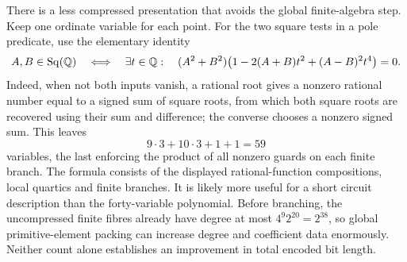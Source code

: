 There is a less compressed presentation that avoids the global finite-algebra
step. Keep one ordinate variable for each point. For the two square tests
in a pole predicate, use the elementary identity
\[
 A,B\in\operatorname{Sq}(\mathbb Q)\quad\Longleftrightarrow\quad
 \exists t\in\mathbb Q:\quad
 (A^2+B^2)\bigl(1-2(A+B)t^2+(A-B)^2t^4\bigr)=0.
\]
Indeed, when not both inputs vanish, a rational root gives a nonzero
rational number equal to a signed sum of square roots, from which both
square roots are recovered using their sum and difference; the converse
chooses a nonzero signed sum. This leaves
\[
              9\cdot3+10\cdot3+1+1=59
\]
variables, the last enforcing the product of all nonzero guards on each
finite branch. The formula consists of the displayed rational-function
compositions, local quartics and finite branches. It is likely more useful
for a short circuit description than the forty-variable polynomial.
Before branching, the uncompressed finite fibres already have degree at
most $4^9 2^{20}=2^{38}$, so global primitive-element packing can increase
degree and coefficient data enormously. Neither count alone establishes
an improvement in total encoded bit length.
